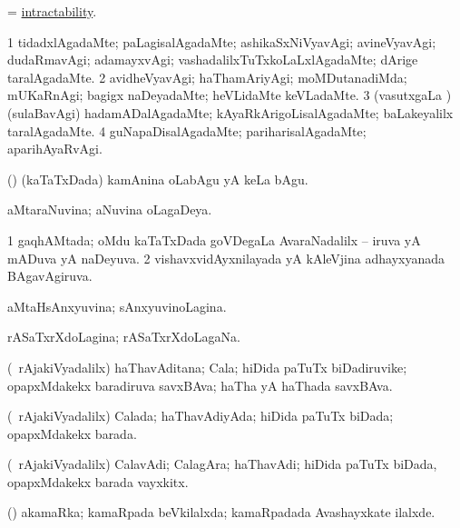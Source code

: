 \bentry
{}
\gl{\nA}
\bmng
= \hyperlink{intractability}{intractability}. 
\emng
\eentry

\bentry
{}
\gl{\kirxvi}
\bmng
\bnum
\num{1} tidadxlAgadaMte; paLagisalAgadaMte; ashikaSxNiVyavAgi; avineVyavAgi; dudaRmavAgi; adamayxvAgi; vashadalilxTuTxkoLaLxlAgadaMte; dArige taralAgadaMte. 
\num{2} avidheVyavAgi; haThamAriyAgi; moMDutanadiMda; mUKaRnAgi; bagigx naDeyadaMte; heVLidaMte keVLadaMte. 
\num{3} (vasutxgaLa \vi) (sulaBavAgi) hadamADalAgadaMte; kAyaRkArigoLisalAgadaMte; baLakeyalilx taralAgadaMte. 
\num{4} guNapaDisalAgadaMte; pariharisalAgadaMte; aparihAyaRvAgi. 
\enum
\emng
\eentry

\bentry
{}
\gl{\nA}
\bmng
(\vAshi) (kaTaTxDada) kamAnina oLabAgu yA keLa bAgu.   
\emng
\eentry

\bentry
{}
\gl{\gu}
\bmng
aMtaraNuvina; aNuvina oLagaDeya. 
\emng
\eentry

\bentry
{}
\gl{\gu}
\bmng
\bnum
\num{1} gaqhAMtada; oMdu kaTaTxDada goVDegaLa AvaraNadalilx -- iruva yA mADuva yA naDeyuva. 
\num{2} vishavxvidAyxnilayada yA kAleVjina adhayxyanada BAgavAgiruva. 
\enum
\emng
\eentry

\bentry
{}
\gl{\gu}
\bmng
aMtaHsAnxyuvina; sAnxyuvinoLagina. 
\emng
\eentry

\bentry
{}
\gl{\gu}
\bmng
rASaTxrXdoLagina; rASaTxrXdoLagaNa. 
\emng
\eentry

\bentry
{}
\gl{\nA}
\bmng
(\kanmu\ rAjakiVyadalilx) haThavAditana; Cala; hiDida paTuTx biDadiruvike; opapxMdakekx baradiruva savxBAva; haTha yA haThada savxBAva. 
\emng
\eentry

\bentry
{}
\gl{\gu}
\bmng
(\kanmu\ rAjakiVyadalilx) Calada; haThavAdiyAda; hiDida paTuTx biDada; opapxMdakekx barada. 
\emng
\eentry

\bentry
{}
\gl{\nA}
\bmng
(\kanmu\ rAjakiVyadalilx) CalavAdi; CalagAra; haThavAdi; hiDida paTuTx biDada, opapxMdakekx barada vayxkitx. 
\emng
\eentry

\bentry
{}
\gl{\gu}
\bmng
(\vAyx) akamaRka; kamaRpada beVkilalxda; kamaRpadada Avashayxkate ilalxde. 
\emng
\eentry

